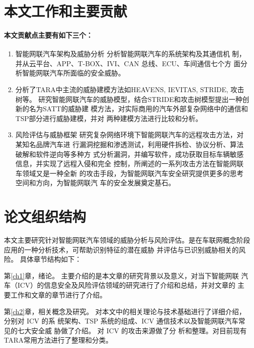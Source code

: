 \section{本文工作和主要贡献}
\paragraph{本文贡献点主要有如下三个：}

\begin{enumerate}
    \item 智能网联汽车架构及威胁分析 
    \newline
    分析智能网联汽车的系统架构及其通信机
    制，并从云平台、APP、T-BOX、IVI、CAN 总线、ECU、车间通信七个方
    面分析智能网联汽车所面临的安全威胁。
    \item 分析了TARA中主流的威胁建模方法如HEAVENS, IEVITAS, STRIDE, 攻击树等。
    \newline
    研究智能网联汽车的威胁模型，结合STRIDE和攻击树模型提出一种创新的名为SATT的威胁建
模方法，对实际商用的汽车外部复杂网络中的通信和TSP部分进行威胁建模，并对
两种建模方法进行比较和分析。
    \item 风险评估与威胁框架
    \newline 
    研究复杂网络环境下智能网联汽车的远程攻击方法，对某知名品牌汽车进
行漏洞挖掘和渗透测试，利用硬件拆检、协议分析、算法破解和软件逆向等多种方
式分析漏洞，并编写软件，成功获取目标车辆敏感信息，并实现了远程入侵和完全
控制，所阐述的一系列攻击方法在智能网联车领域又是一种全新
的攻击手段，为智能网联汽车安全研究提供更多的思考空间和方向，为智能网联汽
车的安全发展奠定基石。

\end{enumerate}


\section{论文组织结构}
本文主要研究针对智能网联汽车领域的威胁分析与风险评估。是在车联网概念阶段应用的一种分析技术，可帮助识别特征的潜在威胁 并评估与已识别威胁相关的风险。
具体章节结构如下：

第\ref{ch1}章，绪论。
主要介绍的是本文章的研究背景以及意义，对当下智能网联
汽车（ICV）的信息安全及风险评估领域的研究进行了介绍和总结，并对文章的
主要工作和文章的章节进行了介绍。

第\ref{ch2}章，相关概念及研究。
对本文中的相关理论与技术基础进行了详细介绍，分别对 ICV 的系
统架构、TSP 系统的组成、ICV 通信技术以及智能网联汽车常见的七大安全威
胁做了介绍。
对 ICV 的攻击来源做了分
析和整理。对目前现有TARA常用方法进行了整理和分类。

